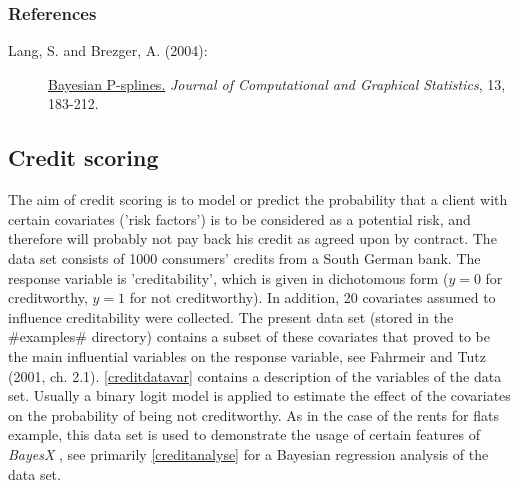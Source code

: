 \subsubsection*{References}

\begin{description}

\item[Lang, S. and Brezger, A. (2004):]
\href{http://www.stat.uni-muenchen.de/~lang/publications.html}
{Bayesian P-splines.} {\it Journal of Computational and Graphical
Statistics}, 13, 183-212.

\end{description}


\subsection{Credit scoring}
\label{creditdata}  

The aim of credit scoring is to model or predict the probability
that a client with certain covariates ('risk factors') is to be
considered as a potential risk, and therefore will probably not
pay back his credit as agreed upon by contract. The data set
consists of 1000 consumers' credits from a South German bank. The
response variable is 'creditability', which is given in
dichotomous form ($y=0$ for creditworthy, $y=1$ for not
creditworthy). In addition, 20 covariates assumed to influence
creditability were collected. The present data set (stored in the
#examples# directory)  contains a subset of these covariates
that proved to be the main influential variables on the response
variable, see Fahrmeir and Tutz (2001, ch. 2.1). \autoref{creditdatavar}
contains a description of the variables of the data set. Usually a
binary logit model is applied to estimate the effect of the
covariates on the probability of being not creditworthy. As in the
case of the rents for flats example, this data set is used to
demonstrate the usage of certain features of {\em BayesX} , see
primarily \autoref{creditanalyse} for a Bayesian regression
analysis of the data set.

